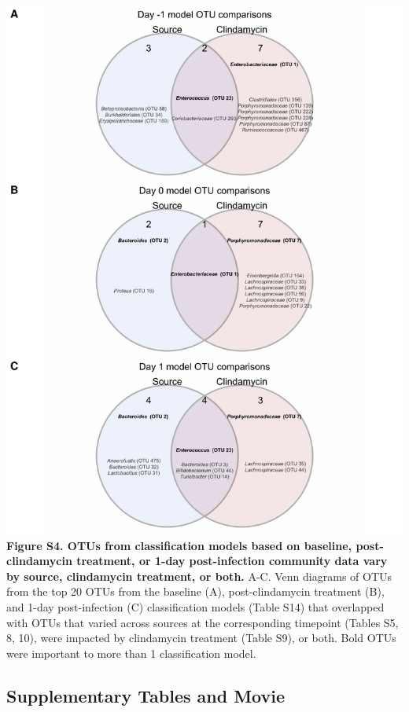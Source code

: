 \documentclass[
  11pt,
]{article}
\begin{document}
\includegraphics{figure_S4.pdf} \textbf{Figure S4. OTUs from
classification models based on baseline, post-clindamycin treatment, or
1-day post-infection community data vary by source, clindamycin
treatment, or both.} A-C. Venn diagrams of OTUs from the top 20 OTUs
from the baseline (A), post-clindamycin treatment (B), and 1-day
post-infection (C) classification models (Table S14) that overlapped
with OTUs that varied across sources at the corresponding timepoint
(Tables S5, 8, 10), were impacted by clindamycin treatment (Table S9),
or both. Bold OTUs were important to more than 1 classification model.

\newpage

\hypertarget{supplementary-tables-and-movie}{%
\subsection{Supplementary Tables and
Movie}\label{supplementary-tables-and-movie}}
\end{document}
